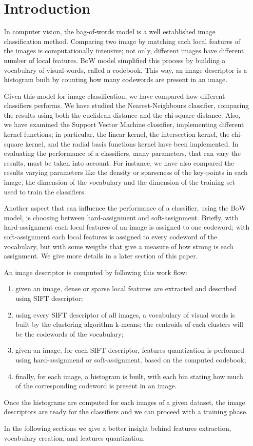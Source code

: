 \section{Introduction}

In computer vision, the bag-of-words model is a well established image classification method. Comparing two image by matching each local features of the images is computationally intensive; not only, different images have different number of local features. BoW model simplified this process by building a vocabulary of visual-words, called a codebook. This way, an image descriptor is a histogram built by counting how many codewords are present in an image.

Given this model for image classification, we have compared how different classifiers performs.
We have studied the Nearest-Neighbours classifier, comparing the results using both the euclidean distance and the chi-square distance.
Also, we have examined the Support Vector Machine classifier, implementing different kernel functions; in particular, the linear kernel, the intersection kernel, the chi-square kernel, and the radial basis functions kernel have been implemented.
In evaluating the performance of a classifiers, many parameters, that can vary the results, must be taken into account.
For instance, we have also compared the results varying parameters like the density or sparseness of the key-points in each image, the dimension of the vocabulary and the dimension of the training set used to train the classifiers.

Another aspect that can influence the performance of a classifier, using the BoW model, is choosing between hard-assignment and soft-assignment. Briefly, with hard-assignment each local features of an image is assigned to one codeword; with soft-assignment each local features is assigned to every codeword of the vocabulary, but with some weigths that give a measure of how strong is each assignment. We give more details in a later section of this paper.

An image descriptor is computed by following this work flow:
\begin{enumerate}
\item given an image, dense or sparse local features are extracted and described using SIFT descriptor;
\item using every SIFT descriptor of all images, a vocabulary of visual words is built by the clustering algorithm k-means; the centroids of each clusters will be the codewords of the vocabulary;
\item given an image, for each SIFT descriptor, features quantization is performed using hard-assignmend or soft-assignment, based on the computed codebook;
\item finally, for each image, a histogram is built, with each bin stating how much of the corresponding codeword is present in an image.
\end{enumerate}

Once the histograms are computed for each images of a given dataset, the image descriptors are ready for the classifiers and we can proceed with a training phase.

In the following sections we give a better insight behind features extraction, vocabulary creation, and features quantization.




